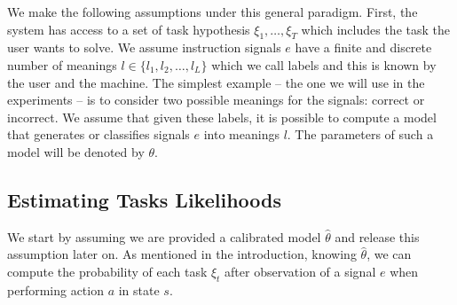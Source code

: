 We make the following assumptions under this general paradigm. First, the system has access to a set of task hypothesis $\xi_1,\ldots,\xi_T$ which includes the task the user wants to solve. We assume instruction signals $e$ have a finite and discrete number of meanings $l \in \{l_1, l_2, \ldots, l_L\}$ which we call labels and this is known by the user and the machine. The simplest example -- the one we will use in the experiments -- is to consider two  possible meanings for the signals: correct or incorrect. We assume that given these labels, it is possible to compute a model that generates or classifies signals $e$ into meanings $l$. The parameters of such a model will be denoted by $\theta$.


 




\subsection{Estimating Tasks Likelihoods}


We start by assuming we are provided a calibrated model $\hat{\theta}$ and release this assumption later on.
%
As mentioned in the introduction, knowing $\hat{\theta}$, we can compute the probability of each task $\xi_t$ after observation of a signal $e$ when performing action $a$ in state $s$.

